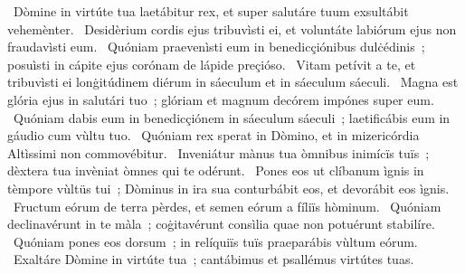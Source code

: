 \psalmChapterWithInscription{}
{ }
{%
~Dòmine in virtúte tua laetábitur rex, et super salutáre tuum exsultábit vehemènter. 
~Desidèrium cordis ejus tribuvìsti ei, et voluntáte labiórum ejus non fraudavìsti eum. 
~Quóniam praevenìsti eum in benedicçiónibus dulċédinis~; posuìsti in cápite ejus corónam de lápide preçióso. 
~Vitam petívit a te, et tribuvìsti ei lonġitúdinem diérum in sáeculum et in sáeculum sáeculi. 
~Magna est glória ejus in salutári tuo~; glóriam et magnum decórem impónes super eum. 
~Quóniam dabis eum in benedicçiónem in sáeculum sáeculi~; laetificábis eum in gáudio cum vùltu tuo. 
~Quóniam rex sperat in Dòmino, et in mizericórdia Altìssimi non commovébitur. 
~Inveniátur mànus tua òmnibus inimícïs tuïs~; dèxtera tua invèniat òmnes qui te odérunt. 
~Pones eos ut clíbanum ìgnis in tèmpore vùltüs tui~; Dòminus in ira sua conturbábit eos, et devorábit eos ìgnis. 
~Fructum eórum de terra pèrdes, et semen eórum a fíliïs hòminum. 
~Quóniam declinavérunt in te màla~; coġitavérunt consìlia quae non potuérunt stabilíre. 
~Quóniam pones eos dorsum~; in relíquiïs tuïs praeparábis vùltum eórum. 
~Exaltáre Dòmine in virtúte tua~; cantábimus et psallémus virtútes tuas. 
}
